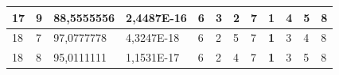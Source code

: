 \documentclass[conference]{IEEEtran}
\begin{document}
\begin{table}[]
\begin{tabular}{|llll|llllllll|}
\multicolumn{1}{|l|}{17}                                                    & \multicolumn{1}{l|}{9}                                                        & \multicolumn{1}{l|}{88,5555556}                                                   & 2,4487E-16                     & \multicolumn{1}{l|}{6}                                                  & \multicolumn{1}{l|}{3}                                                  & \multicolumn{1}{l|}{2}                                                  & \multicolumn{1}{l|}{7}                                                  & \multicolumn{1}{l|}{\textbf{1}}                                         & \multicolumn{1}{l|}{4}                                                  & \multicolumn{1}{l|}{5}                                                  & 8                          \\ \hline
\multicolumn{1}{|l|}{18}                                                    & \multicolumn{1}{l|}{7}                                                        & \multicolumn{1}{l|}{97,0777778}                                                   & 4,3247E-18                     & \multicolumn{1}{l|}{6}                                                  & \multicolumn{1}{l|}{2}                                                  & \multicolumn{1}{l|}{5}                                                  & \multicolumn{1}{l|}{7}                                                  & \multicolumn{1}{l|}{\textbf{1}}                                         & \multicolumn{1}{l|}{3}                                                  & \multicolumn{1}{l|}{4}                                                  & 8                          \\ \hline
\multicolumn{1}{|l|}{18}                                                    & \multicolumn{1}{l|}{8}                                                        & \multicolumn{1}{l|}{95,0111111}                                                   & 1,1531E-17                     & \multicolumn{1}{l|}{6}                                                  & \multicolumn{1}{l|}{2}                                                  & \multicolumn{1}{l|}{4}                                                  & \multicolumn{1}{l|}{7}                                                  & \multicolumn{1}{l|}{\textbf{1}}                                         & \multicolumn{1}{l|}{3}                                                  & \multicolumn{1}{l|}{5}                                                  & 8                          \\ \hline

\end{tabular}
\end{table}
\end{document}
